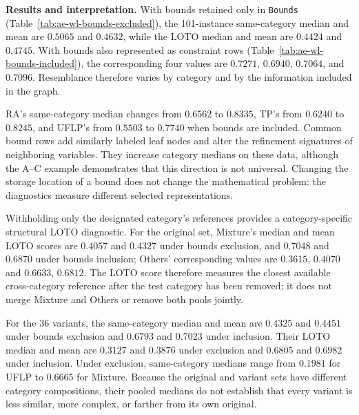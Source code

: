 \documentclass[10pt]{article}
\begin{document}
\medskip
\textbf{Results and interpretation.}
With bounds retained only in \texttt{Bounds}
(Table~\ref{tab:ae-wl-bounds-excluded}), the 101-instance same-category
median and mean are $0.5065$ and $0.4632$, while the LOTO median and mean
are $0.4424$ and $0.4745$. With bounds also represented as constraint rows
(Table~\ref{tab:ae-wl-bounds-included}), the corresponding four values are
$0.7271$, $0.6940$, $0.7064$, and $0.7096$.
Resemblance therefore varies by category and by the information
included in the graph.

RA's same-category median changes from $0.6562$ to $0.8335$,
TP's from $0.6240$ to $0.8245$, and UFLP's from $0.5503$ to
$0.7740$ when bounds are included.
Common bound rows add similarly labeled leaf nodes and alter the
refinement signatures of neighboring variables.
They increase category medians on these data, although the A--C
example demonstrates that this direction is not universal.
Changing the storage location of a bound does not change the
mathematical problem: the diagnostics measure different selected
representations.

Withholding only the designated category's references provides a
category-specific structural LOTO diagnostic. For the original set,
Mixture's median and mean LOTO scores are $0.4057$ and $0.4327$ under
bounds exclusion, and $0.7048$ and $0.6870$ under bounds inclusion;
Others' corresponding values are $0.3615$, $0.4070$ and $0.6633$,
$0.6812$. The LOTO score therefore measures the closest available
cross-category reference after the test category has been removed; it
does not merge Mixture and Others or remove both pools jointly.

For the 36 variants, the same-category median and mean are $0.4325$ and
$0.4451$ under bounds exclusion and $0.6793$ and $0.7023$ under
inclusion. Their LOTO median and mean are $0.3127$ and $0.3876$ under
exclusion and $0.6805$ and $0.6982$ under inclusion. Under exclusion,
same-category medians range from $0.1981$ for UFLP to $0.6665$ for
Mixture.
Because the original and variant sets have different category
compositions, their pooled medians do not establish that every
variant is less similar, more complex, or farther from its own original.
\end{document}
